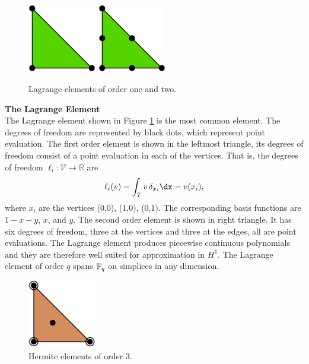\begin{figure}
  \begin{center}
    \includegraphics[height=3cm]{chapters/kirby-6/pdf/P1.pdf} \hspace{1.0cm}
    \includegraphics[height=3cm]{chapters/kirby-6/pdf/P2.pdf} \hspace{1.0cm}
    \caption{Lagrange elements of order one and two.}
    \label{Lagrange}
  \end{center}
\end{figure}

\begin{example}{\bf{The Lagrange Element}} \\
The Lagrange element shown in Figure \ref{Lagrange} is the most common
element.  The degrees of freedom are represented by black dots, which
represent point evaluation.  The first order element is shown in the
leftmost triangle, its degrees of freedom consist of a point evaluation
in each of the vertices.  That is, the degrees of freedom $\ell_i :
\mathcal{V} \rightarrow \mathbb{R}$ are
\begin{equation}
\ell_i ( v) = \int_{T} v \, \delta_{x_i} \dx = v(x_i),
\end{equation}
where $x_i$ are the vertices (0,0), (1,0), (0,1).  The corresponding basis
functions are $1-x-y$, $x$, and $y$.  The second order element is shown
in right triangle. It has six degrees of freedom, three at the vertices
and three at the edges, all are point evaluations.  The Lagrange element
produces piecewise continuous polynomials and they are therefore well
suited for approximation in $H^1$.  The Lagrange element of order $q$
spans $\P_q$ on simplices in any dimension.
\end{example}

\begin{figure}
  \begin{center}
    \includegraphics[height=3cm]{chapters/kirby-6/pdf/HER3.pdf}
    \caption{Hermite elements of order 3.}
    \label{Hermite}
  \end{center}
\end{figure}

